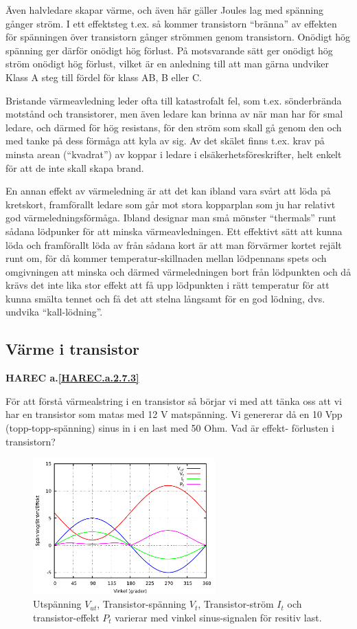 Även halvledare skapar värme, och även här gäller Joules lag med spänning
gånger ström. I ett effektsteg t.ex. så kommer transistorn ``bränna'' av
effekten för spänningen över transistorn gånger strömmen genom transistorn.
Onödigt hög spänning ger därför onödigt hög förlust. På motsvarande sätt ger
onödigt hög ström onödigt hög förlust, vilket är en anledning till att man
gärna undviker Klass A steg till fördel för klass AB, B eller C.

Bristande värmeavledning leder ofta till katastrofalt fel, som t.ex.
sönderbrända motstånd och transistorer, men även ledare kan brinna av när man
har för smal ledare, och därmed för hög resistans, för den ström som skall gå
genom den och med tanke på dess förmåga att kyla av sig. Av det skälet finns
t.ex. krav på minsta arean (``kvadrat'') av koppar i ledare i
elsäkerhetsföreskrifter, helt enkelt för att de inte skall skapa brand.

En annan effekt av värmeledning är att det kan ibland vara svårt att löda på
kretskort, framförallt ledare som går mot stora kopparplan som ju har relativt
god värmeledningsförmåga. Ibland designar man små mönster ``thermals'' runt
sådana lödpunker för att minska värmeavledningen. Ett effektivt sätt att
kunna löda och framförallt löda av från sådana kort är att man förvärmer kortet
rejält runt om, för då kommer temperatur-skillnaden mellan lödpennans spets
och omgivningen att minska och därmed värmeledningen bort från lödpunkten och
då krävs det inte lika stor effekt att få upp lödpunkten i rätt temperatur för
att kunna smälta tennet och få det att stelna långsamt för en god lödning, dvs.
undvika ``kall-lödning''.

\subsection{Värme i transistor}
\textbf{
HAREC a.\ref{HAREC.a.2.7.3}\label{myHAREC.a.2.7.3}
}

För att förstå värmealstring i en transistor så börjar vi med att tänka oss
att vi har en transistor som matas med 12 V matspänning. Vi genererar då en
10 Vpp (topp-topp-spänning) sinus in i en last med 50 Ohm. Vad är effekt-
förlusten i transistorn?

\begin{figure}[h]
\begin{center}
\includegraphics[width=7cm]{images/power1}
\caption{Utspänning $V_{ut}$, Transistor-spänning $V_t$, Transistor-ström $I_t$ och transistor-effekt $P_t$ varierar med vinkel sinus-signalen för resitiv last.}
\label{fig:power1}
\end{center}
\end{figure}

